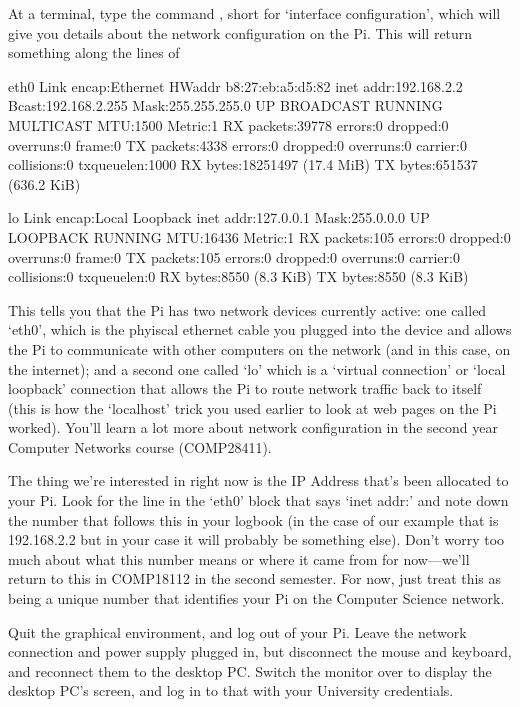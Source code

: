 At a terminal, type the command , short for `interface configuration', which will give you details about the network configuration on the Pi. This will return something along the lines of

\begin{ttoutenv}
eth0      Link encap:Ethernet  HWaddr b8:27:eb:a5:d5:82
          inet addr:192.168.2.2  Bcast:192.168.2.255  Mask:255.255.255.0
          UP BROADCAST RUNNING MULTICAST  MTU:1500  Metric:1
          RX packets:39778 errors:0 dropped:0 overruns:0 frame:0
          TX packets:4338 errors:0 dropped:0 overruns:0 carrier:0
          collisions:0 txqueuelen:1000
          RX bytes:18251497 (17.4 MiB)  TX bytes:651537 (636.2 KiB)

lo        Link encap:Local Loopback
          inet addr:127.0.0.1  Mask:255.0.0.0
          UP LOOPBACK RUNNING  MTU:16436  Metric:1
          RX packets:105 errors:0 dropped:0 overruns:0 frame:0
          TX packets:105 errors:0 dropped:0 overruns:0 carrier:0
          collisions:0 txqueuelen:0
          RX bytes:8550 (8.3 KiB)  TX bytes:8550 (8.3 KiB)
\end{ttoutenv}

This tells you that the Pi has two network devices currently active: one called `eth0', which is the phyiscal ethernet cable you plugged into the device and allows the Pi to communicate with other computers on the network (and in this case, on the internet); and a second one called `lo' which is a `virtual connection' or `local loopback' connection that allows the Pi to route network traffic back to itself (this is how the `localhost' trick you used earlier to look at web pages on the Pi worked). You'll learn a lot more about network configuration in the second year Computer Networks course (COMP28411). 

The thing we're interested in right now is the IP Address that's been allocated to your Pi. Look for the line in the `eth0' block that says `inet addr:' and note down the number that follows this in your logbook (in the case of our example that is 192.168.2.2 but in your case it will probably be something else). Don't worry too much about what this number means or where it came from for now---we'll return to this in COMP18112 in the second semester. For now, just treat this as being a unique number that identifies your Pi on the Computer Science network. 

Quit the graphical environment, and log out of your Pi. Leave the network connection and power supply plugged in, but disconnect the mouse and keyboard, and reconnect them to the desktop PC. Switch the monitor over to display the desktop PC's screen, and log in to that with your University credentials. 

